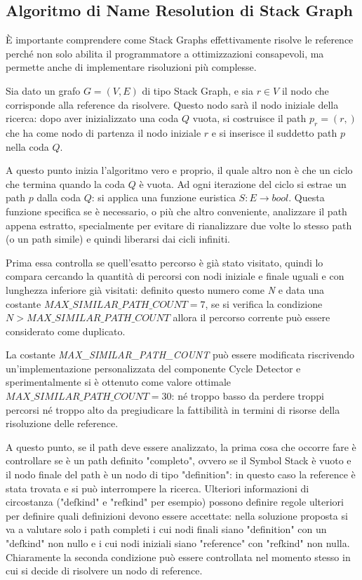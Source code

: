 \subsection{Algoritmo di Name Resolution di Stack Graph}

\`E importante comprendere come Stack Graphs effettivamente risolve le reference perch\'e non solo abilita il programmatore a ottimizzazioni consapevoli, ma permette anche di implementare risoluzioni pi\`u complesse.

\par
Sia dato un grafo $G = (V, E)$ di tipo Stack Graph, e sia $r \in V$ il nodo che corrisponde alla reference da risolvere. Questo nodo sar\`a il nodo iniziale della ricerca: dopo aver inizializzato una coda $Q$ vuota, si costruisce il path $p_r = (r,)$ che ha come nodo di partenza il nodo iniziale $r$ e si inserisce il suddetto path $p$ nella coda $Q$.

\par
A questo punto inizia l'algoritmo vero e proprio, il quale altro non \`e che un ciclo che termina quando la coda $Q$ \`e vuota.
Ad ogni iterazione del ciclo si estrae un path $p$ dalla coda $Q$: si applica una funzione euristica $S : E \rightarrow bool$.
Questa funzione specifica se \`e necessario, o pi\`u che altro conveniente, analizzare il path appena estratto, specialmente per evitare di rianalizzare due volte lo stesso path (o un path simile) e quindi liberarsi dai cicli infiniti.

\par
Prima essa controlla se quell'esatto percorso \`e gi\`a stato visitato, quindi lo compara cercando la quantit\`a di percorsi con nodi iniziale e finale uguali e con lunghezza inferiore gi\`a visitati: definito questo numero come \emph{N} e data una costante $MAX\_SIMILAR\_PATH\_COUNT = 7$, se si verifica la condizione $N > MAX\_SIMILAR\_PATH\_COUNT$ allora il percorso corrente pu\`o essere considerato come duplicato.

\par
La costante \emph{MAX\_SIMILAR\_PATH\_COUNT} pu\`o essere modificata riscrivendo un'implementazione personalizzata del componente Cycle Detector e sperimentalmente si \`e ottenuto come valore ottimale $MAX\_SIMILAR\_PATH\_COUNT = 30$: n\'e troppo basso da perdere troppi percorsi n\'e troppo alto da pregiudicare la fattibilit\`a in termini di risorse della risoluzione delle reference.

\par
A questo punto, se il path deve essere analizzato, la prima cosa che occorre fare \`e controllare se \`e un path definito "completo", ovvero se il Symbol Stack \`e vuoto e il nodo finale del path \`e un nodo di tipo "definition": in questo caso la reference \`e stata trovata e si pu\`o interrompere la ricerca.
Ulteriori informazioni di circostanza ("defkind" e "refkind" per esempio) possono definire regole ulteriori per definire quali definizioni devono essere accettate: nella soluzione proposta si va a valutare solo i path completi i cui nodi finali siano "definition" con un "defkind" non nullo e i cui nodi iniziali siano "reference" con "refkind" non nulla. Chiaramente la seconda condizione pu\`o essere controllata nel momento stesso in cui si decide di risolvere un nodo di reference.

